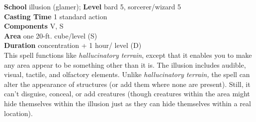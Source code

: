 \textbf{School} illusion (glamer); \textbf{Level} bard 5, sorcerer/wizard 5\\
\textbf{Casting Time} 1 standard action\\
\textbf{Components} V, S\\
\textbf{Area} one 20-ft. cube/level (S)\\
\textbf{Duration} concentration + 1 hour/ level (D)\\
This spell functions like \textit{hallucinatory terrain}, except that it enables you to make any area appear to be something other than it is. The illusion includes audible, visual, tactile, and olfactory elements. Unlike \textit{hallucinatory terrain, }the spell can alter the appearance of structures (or add them where none are present). Still, it can't disguise, conceal, or add creatures (though creatures within the area might hide themselves within the illusion just as they can hide themselves within a real location).\\
